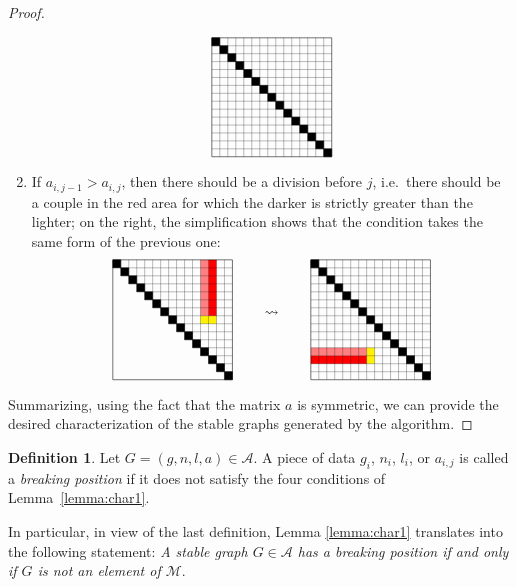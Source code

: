 \documentclass{amsart}
\theoremstyle{plain}
\theoremstyle{definition}
\newtheorem{definition}[theorem]{Definition}
\begin{document}
\begin{proof}
\begin{enumerate}
\[\begin{tikzpicture}[xscale=0.2,yscale=-0.2,baseline=-40]
      \draw (0,0) -- (15,0) -- (15,15) -- (0,15) -- cycle;
      \foreach \x in {1,2,...,14}
      {
        \draw [very thin] (0,\x) -- (15,\x);
        \draw [very thin] (\x,0) -- (\x,15);
      }
      \foreach \x in {0,1,...,14}
        \filldraw  (\x,\x) -- (\x,\x+1) -- (\x+1,\x+1) -- (\x+1,\x) -- cycle;
    \end{tikzpicture}
    \]
  \item If $a_{i, j-1} > a_{i, j}$, then there should be a division
    before $j$, i.e.\ there should be a couple in the red area for
    which the darker is strictly greater than the lighter; on the
    right, the simplification shows that the condition takes the same
    form of the previous one:
    \[
    \begin{tikzpicture}[xscale=0.2,yscale=-0.2,baseline=-40]
      \fill [yellow] (13,7) -- (13,8) -- (11,8) -- (11,7) -- cycle;
      \fill [red!50] (11,0) -- (11,7) -- (12,7) -- (12,0) -- cycle;
      \fill [red!100] (12,0) -- (12,7) -- (13,7) -- (13,0) -- cycle;

      \draw (0,0) -- (15,0) -- (15,15) -- (0,15) -- cycle;
      \foreach \x in {1,2,...,14}
      {
        \draw [very thin] (\x,\x) -- (15,\x);
        \draw [very thin] (\x,0) -- (\x,\x);
      }
      \foreach \x in {0,1,...,14}
        \filldraw (\x,\x) -- (\x,\x+1) -- (\x+1,\x+1) -- (\x+1,\x) -- cycle;
    \end{tikzpicture}
    \qquad \leadsto \qquad
    \begin{tikzpicture}[xscale=0.2,yscale=-0.2,baseline=-40]
      \fill [yellow] (7,13) -- (8,13) -- (8,11) -- (7,11) -- cycle;
      \fill [red!50] (0,11) -- (7,11) -- (7,12) -- (0,12) -- cycle;
      \fill [red!100] (0,12) -- (7,12) -- (7,13) -- (0,13) -- cycle;

      \draw (0,0) -- (15,0) -- (15,15) -- (0,15) -- cycle;
      \foreach \x in {1,2,...,14}
      {
        \draw [very thin] (0,\x) -- (15,\x);
        \draw [very thin] (\x,0) -- (\x,15);
      }
      \foreach \x in {0,1,...,14}
        \filldraw (\x,\x) -- (\x,\x+1) -- (\x+1,\x+1) -- (\x+1,\x) -- cycle;
    \end{tikzpicture}
    \]
  \end{enumerate}

  Summarizing, using the fact that the matrix $a$ is symmetric, we can
  provide the desired characterization of the stable graphs generated
  by the algorithm.
\end{proof}

\begin{definition}
  Let $G = (g, n, l, a) \in \mathcal{A}$. A piece of data $g_i$,
  $n_i$, $l_i$, or $a_{i,j}$ is called a \emph{breaking position\/} if
  it does not satisfy the four conditions of
  Lemma~\ref{lemma:char1}. 
\end{definition}
In particular, in view of the last definition, Lemma \ref{lemma:char1} translates into the following statement: \emph{A stable graph $G \in \mathcal{A}$ has a breaking position
  if and only if $G$ is not an element of $\mathcal{M}$}.
\end{document}
